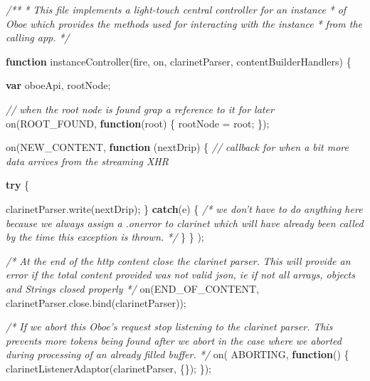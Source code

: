 \documentclass[]{article}
\newenvironment{Shaded}{}{}
\newcommand{\KeywordTok}[1]{\textcolor[rgb]{0.00,0.44,0.13}{\textbf{{#1}}}}
\newcommand{\CommentTok}[1]{\textcolor[rgb]{0.38,0.63,0.69}{\textit{{#1}}}}
\newcommand{\OtherTok}[1]{\textcolor[rgb]{0.00,0.44,0.13}{{#1}}}
\newcommand{\FunctionTok}[1]{\textcolor[rgb]{0.02,0.16,0.49}{{#1}}}
\newcommand{\NormalTok}[1]{{#1}}
\begin{document}
\begin{Shaded}
\begin{Highlighting}[]
\CommentTok{/**}
\CommentTok{ * This file implements a light-touch central controller for an instance }
\CommentTok{ * of Oboe which provides the methods used for interacting with the instance }
\CommentTok{ * from the calling app.}
\CommentTok{ */}
 
 
\KeywordTok{function} \FunctionTok{instanceController}\NormalTok{(fire, on, clarinetParser, contentBuilderHandlers) \{}
  
   \KeywordTok{var} \NormalTok{oboeApi, rootNode;}

   \CommentTok{// when the root node is found grap a reference to it for later      }
   \FunctionTok{on}\NormalTok{(ROOT_FOUND, }\KeywordTok{function}\NormalTok{(root) \{}
      \NormalTok{rootNode = root;   }
   \NormalTok{\});}
                              
   \FunctionTok{on}\NormalTok{(NEW_CONTENT,         }
      \KeywordTok{function} \NormalTok{(nextDrip) \{}
         \CommentTok{// callback for when a bit more data arrives from the streaming XHR         }
          
         \KeywordTok{try} \NormalTok{\{}
            
            \OtherTok{clarinetParser}\NormalTok{.}\FunctionTok{write}\NormalTok{(nextDrip);            }
         \NormalTok{\} }\KeywordTok{catch}\NormalTok{(e) \{ }
            \CommentTok{/* we don't have to do anything here because we always assign}
\CommentTok{               a .onerror to clarinet which will have already been called }
\CommentTok{               by the time this exception is thrown. */}                
         \NormalTok{\}}
      \NormalTok{\}}
   \NormalTok{);}
   
   \CommentTok{/* At the end of the http content close the clarinet parser.}
\CommentTok{      This will provide an error if the total content provided was not }
\CommentTok{      valid json, ie if not all arrays, objects and Strings closed properly */}
   \FunctionTok{on}\NormalTok{(END_OF_CONTENT, }\OtherTok{clarinetParser}\NormalTok{.}\OtherTok{close}\NormalTok{.}\FunctionTok{bind}\NormalTok{(clarinetParser));}
   

   \CommentTok{/* If we abort this Oboe's request stop listening to the clarinet parser. }
\CommentTok{      This prevents more tokens being found after we abort in the case where }
\CommentTok{      we aborted during processing of an already filled buffer. */}
   \FunctionTok{on}\NormalTok{( ABORTING, }\KeywordTok{function}\NormalTok{() \{}
      \FunctionTok{clarinetListenerAdaptor}\NormalTok{(clarinetParser, \{\});}
   \NormalTok{\});   }


\end{Highlighting}
\end{Shaded}
\end{document}
